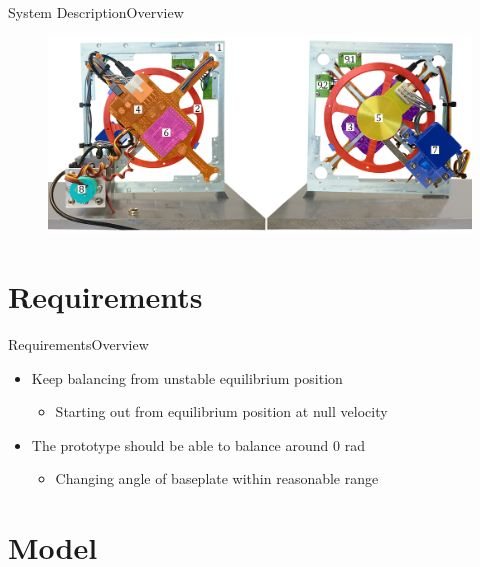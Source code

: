\begin{frame}{System Description}{Overview}
	\begin{figure}[H]
		\centering
		\includegraphics[scale=0.16]{Pictures/Cubli12.png}
	\end{figure}
\end{frame}

\section{Requirements}

\begin{frame}{Requirements}{Overview}
\begin{itemize}
 \item {Keep balancing from unstable equilibrium position}
  \begin{itemize}
	\item {Starting out from equilibrium position at null velocity}
	\linebreak
\end{itemize}
\item {The prototype should be able to balance around 0 rad}
	\begin{itemize}
	\item {Changing angle of baseplate within reasonable range}
	\end{itemize}
\end{itemize}


\end{frame}

\section{Model}

